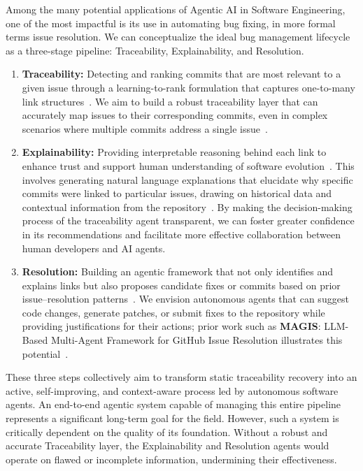 Among the many potential applications of Agentic AI in Software Engineering, one of the most impactful is its use in automating bug fixing, in more formal terms issue resolution. We can conceptualize the ideal bug management lifecycle as a three-stage pipeline: Traceability, Explainability, and Resolution.

\begin{enumerate}
    \item \textbf{Traceability:} Detecting and ranking commits that are most relevant to a given issue through a learning-to-rank formulation that captures one-to-many link structures~\cite{r11,r7,r17}. We aim to build a robust traceability layer that can accurately map issues to their corresponding commits, even in complex scenarios where multiple commits address a single issue~\cite{r21}.

    \item \textbf{Explainability:} Providing interpretable reasoning behind each link to enhance trust and support human understanding of software evolution~\cite{r45}. This involves generating natural language explanations that elucidate why specific commits were linked to particular issues, drawing on historical data and contextual information from the repository~\cite{r7}. By making the decision-making process of the traceability agent transparent, we can foster greater confidence in its recommendations and facilitate more effective collaboration between human developers and AI agents.

    \item \textbf{Resolution:} Building an agentic framework that not only identifies and explains links but also proposes candidate fixes or commits based on prior issue–resolution patterns~\cite{r89,r90}. We envision autonomous agents that can suggest code changes, generate patches, or submit fixes to the repository while providing justifications for their actions; prior work such as \textbf{MAGIS}: LLM-Based Multi-Agent Framework for GitHub Issue Resolution illustrates this potential~\cite{magis}.
\end{enumerate}

\noindent
These three steps collectively aim to transform static traceability recovery into an active, self-improving, and context-aware process led by autonomous software agents. An end-to-end agentic system capable of managing this entire pipeline represents a significant long-term goal for the field. However, such a system is critically dependent on the quality of its foundation. Without a robust and accurate Traceability layer, the Explainability and Resolution agents would operate on flawed or incomplete information, undermining their effectiveness.\\

